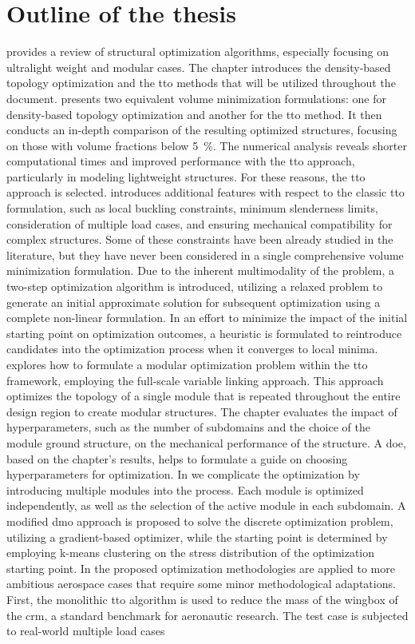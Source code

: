 \section*{Outline of the thesis}
 provides a review of structural optimization algorithms, especially focusing on ultralight weight and modular cases. The chapter introduces the density-based topology optimization and the \gls{tto} methods that will be utilized throughout the document.  presents two equivalent volume minimization formulations: one for density-based topology optimization and another for the \gls{tto} method. It then conducts an in-depth comparison of the resulting optimized structures, focusing on those with volume fractions below \qty{5}{\percent}. The numerical analysis reveals shorter computational times and improved performance with the \gls{tto} approach, particularly in modeling lightweight structures. For these reasons, the \gls{tto} approach is selected.  introduces additional features with respect to the classic \gls{tto} formulation, such as local buckling constraints, minimum slenderness limits, consideration of multiple load cases, and ensuring mechanical compatibility for complex structures. Some of these constraints have been already studied in the literature, but they have never been considered in a single comprehensive volume minimization formulation. Due to the inherent multimodality of the problem, a two-step optimization algorithm is introduced, utilizing a relaxed problem to generate an initial approximate solution for subsequent optimization using a complete non-linear formulation. In an effort to minimize the impact of the initial starting point on optimization outcomes, a heuristic is formulated to reintroduce candidates into the optimization process when it converges to local minima.  explores how to formulate a modular optimization problem within the \gls{tto} framework, employing the full-scale variable linking approach. This approach optimizes the topology of a single module that is repeated throughout the entire design region to create modular structures. The chapter evaluates the impact of hyperparameters, such as the number of subdomains and the choice of the module ground structure, on the mechanical performance of the structure. A \gls{doe}, based on the chapter's results, helps to formulate a guide on choosing hyperparameters for optimization. In  we complicate the optimization by introducing multiple modules into the process. Each module is optimized independently, as well as the selection of the active module in each subdomain. A modified \gls{dmo} approach is proposed to solve the discrete optimization problem, utilizing a gradient-based optimizer, while the starting point is determined by employing k-means clustering on the stress distribution of the optimization starting point. In  the proposed optimization methodologies are applied to more ambitious aerospace cases that require some minor methodological adaptations. First, the monolithic \gls{tto} algorithm is used to reduce the mass of the wingbox of the \gls{crm}, a standard benchmark for aeronautic research. The test case is subjected to real-world multiple load cases 